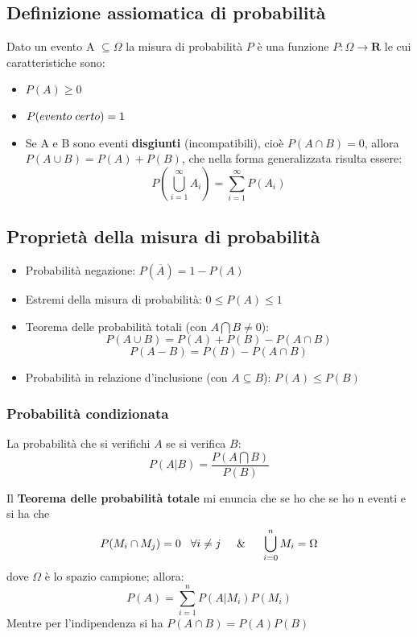 \documentclass{article}
\begin{document}
\subsection{Definizione assiomatica di probabilità}
Dato un evento A $\subseteq \Omega$ la misura di probabilità $P$ è una funzione $P:\Omega \rightarrow \mathbf{R}  $ le cui caratteristiche sono:



\begin{itemize}
    \item $P(A) \geq 0$
    \item $P (evento \hspace{0.1cm} certo)=1$
    \item  Se A e B sono eventi \textbf{disgiunti} (incompatibili), cioè $P(A \cap B) = 0$, allora $P(A \cup B) = P(A)+P(B)$, che nella forma generalizzata risulta essere:
    \[
    P(\bigcup_{i=1}^{\infty}A_i)=\sum_{i=1}^{\infty}P(A_i)
    \]
\end{itemize}

\subsection{Proprietà della misura di probabilità}
\begin{itemize}

    \item Probabilità negazione: $P(\overline{A})=1-P(A)$
    \item Estremi della misura di probabilità: $0 \leq P(A)\leq 1$
    \item Teorema delle probabilità totali (con $A \bigcap B \neq 0$): 
    \[
    P(A \cup B)=P(A)+P(B)-P(A \cap B)
    \]
    \[
    P(A - B)=P(B)-P(A \cap B)
    \]
    \item Probabilità in relazione d'inclusione (con $A\subseteq B$): $P(A)\leq P(B)$
\end{itemize}


\subsubsection{Probabilità condizionata}

La probabilità che si verifichi $A$ se si verifica $B$: 
\[
P(A|B)=\frac{P(A \bigcap B)}{P(B)}
\]

Il \textbf{Teorema delle probabilità totale} mi enuncia che se ho che se ho n eventi e si ha che 
\[ \displaystyle P(M_i \cap M_j)=0 \hspace{0.3cm}\forall i \neq j \hspace{0.5cm} \& \hspace{0.5cm} \bigcup_{i=0}^{n}M_i=\Omega \]
dove $\Omega$ è lo spazio campione; allora:
\[
P(A)=\sum_{i=1}^{n}P(A|M_i)P(M_i)
\]
Mentre per l'indipendenza si ha $P(A \cap B)=P(A)P(B)$
\end{document}

